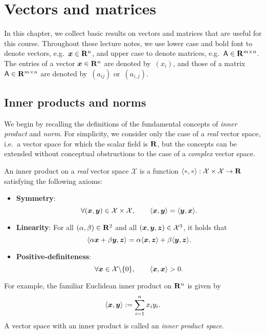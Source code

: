 \setlength{\OuterFrameSep}{0pt}

\chapter{Vectors and matrices}%
\label{cha:vectors_and_matrices}

In this chapter,
we collect basic results on vectors and matrices that are useful for this course.
Throughout these lecture notes,
we use lower case and bold font to denote vectors, e.g.\ $\mathbf{\boldsymbol{x}} \in \mathbf R^n$,
and upper case to denote matrices, e.g.\ $\mathsf A \in \mathbf R^{m \times n}$.
The entries of a vector $\mathbf{\boldsymbol{x}} \in \mathbf R^n$ are denoted by~$(x_i)$,
and those of a matrix $\mathsf A \in \mathbf R^{m \times n}$ are denoted by~$(a_{ij})$ or~$(a_{i,j})$.

\section{Inner products and norms}%
\label{sec:inner_product_and_norm}

We begin by recalling the definitions of the fundamental concepts of \emph{inner product} and \emph{norm}.
For simplicity,
we consider only the case of a \emph{real} vector space,
i.e.\ a vector space for which the scalar field is $\mathbf R$,
but the concepts can be extended without conceptual obstructions to the case of a \emph{complex} vector space.
\begin{definition}
    An inner product on a \emph{real} vector space $\mathcal X$ is a function $\ip{\placeholder,\placeholder}: \mathcal X \times \mathcal X \to \real$ satisfying the following axioms:
    \begin{itemize}
        \item
            \textbf{Symmetry}:
            \[
                \forall (\mathbf{\boldsymbol{x}}, \mathbf{\boldsymbol{y}}) \in \mathcal X \times \mathcal X, \qquad
                \langle\mathbf{\boldsymbol{x}}, \mathbf{\boldsymbol{y}}\rangle = \langle\mathbf{\boldsymbol{y}}, \mathbf{\boldsymbol{x}}\rangle.
            \]

        \item
            \textbf{Linearity}:
            For all $(\alpha, \beta) \in \mathbf R^2$ and all $(\mathbf{\boldsymbol{x}}, \mathbf{\boldsymbol{y}}, \mathbf{\boldsymbol{z}}) \in \mathcal X^3$,
            it holds that
            \[
                \langle\alpha \mathbf{\boldsymbol{x}} + \beta \mathbf{\boldsymbol{y}}, \mathbf{\boldsymbol{z}}\rangle
                = \alpha \langle\mathbf{\boldsymbol{x}}, \mathbf{\boldsymbol{z}}\rangle + \beta \langle\mathbf{\boldsymbol{y}}, \mathbf{\boldsymbol{z}}\rangle.
            \]

        \item
            \textbf{Positive-definiteness}:
            \[
                \forall \mathbf{\boldsymbol{x}} \in \mathcal X \backslash \{0\}, \qquad
                \langle\mathbf{\boldsymbol{x}}, \mathbf{\boldsymbol{x}}\rangle > 0.
            \]
    \end{itemize}
\end{definition}
For example, the familiar Euclidean inner product on $\mathbf R^n$ is given by
\[
    \langle\mathbf{\boldsymbol{x}}, \mathbf{\boldsymbol{y}}\rangle := \sum_{i=1}^{n} x_i y_i.
\]
A vector space with an inner product is called an \emph{inner product space}.

